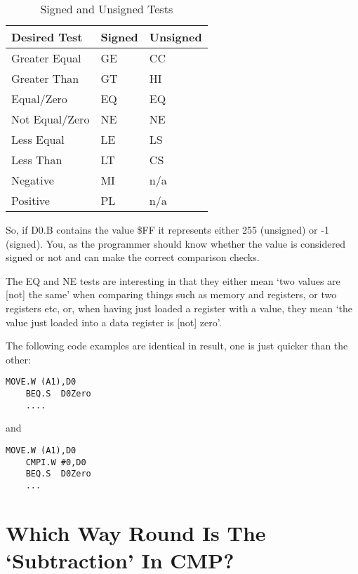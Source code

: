 \begin{table}[htbp]
\centering
\begin{tabular}{l l l}
\toprule
\textbf{Desired Test} & \textbf{Signed} & \textbf{Unsigned} \\
\midrule
%
Greater Equal  & GE & CC  \\
Greater Than   & GT & HI  \\
Equal/Zero     & EQ & EQ  \\
Not Equal/Zero & NE & NE  \\
Less Equal     & LE & LS  \\
Less Than      & LT & CS  \\
Negative       & MI & n/a  \\
Positive       & PL & n/a  \\
%
\bottomrule
\end{tabular}
\caption{Signed and Unsigned Tests}
\label{tab:SignedAndUnsignedTests}
\end{table}

So, if D0.B contains the value \$FF it represents either 255 (unsigned) or -{}1
        (signed). You, as the programmer should know whether the value is considered
        signed or not and can make the correct comparison checks.

The EQ and NE tests are interesting in that they either mean `two values are
        [not] the same' when comparing things such as memory and registers, or two
        registers etc, or, when having just loaded a register with a value, they mean `the
        value just loaded into a data register is [not] zero'.

The following code examples are identical in result, one is just quicker
        than the other:

\begin{lstlisting}[firstnumber=1,]
    MOVE.W (A1),D0
    BEQ.S  D0Zero
    ....
\end{lstlisting}

and

\begin{lstlisting}[firstnumber=1,]
    MOVE.W (A1),D0
    CMPI.W #0,D0
    BEQ.S  D0Zero
    ...
\end{lstlisting}

\section{Which Way Round Is The `Subtraction' In CMP?}
\label{ch19-cmp-way-round}%

